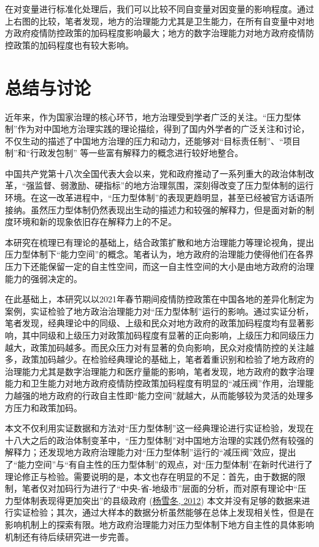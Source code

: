 \documentclass[
  12pt,
]{ctexart}
\begin{document}
在对变量进行标准化处理后，我们可以比较不同自变量对因变量的影响程度。通过上右图的比较，笔者发现，地方的治理能力尤其是卫生能力，在所有自变量中对地方政府疫情防控政策的加码程度影响最大；地方的数字治理能力对地方政府疫情防控政策的加码程度也有较大影响。

\hypertarget{ux603bux7ed3ux4e0eux8ba8ux8bba}{%
\section{总结与讨论}\label{ux603bux7ed3ux4e0eux8ba8ux8bba}}

近年来，作为国家治理的核心环节，地方治理受到学者广泛的关注。``压力型体制''作为对中国地方治理实践的理论描绘，得到了国内外学者的广泛关注和讨论，不仅生动的描述了中国地方治理的压力和动力，还能够对``目标责任制''、``项目制''和``行政发包制'' 等一些富有解释力的概念进行较好地整合。

中国共产党第十八次全国代表大会以来，党和政府推动了一系列重大的政治体制改革，``强监督、弱激励、硬指标''的地方治理氛围，深刻得改变了压力型体制的运行环境。在这一改革进程中，``压力型体制''的表现更趋明显，甚至已经被官方话语所接纳。虽然压力型体制仍然表现出生动的描述力和较强的解释力，但是面对新的制度环境和新的现象依旧存在解释力上的不足。

本研究在梳理已有理论的基础上，结合政策扩散和地方治理能力等理论视角，提出压力型体制下``能力空间''的概念。笔者认为，地方政府的治理能力使得他们在各界压力下还能保留一定的自主性空间，而这一自主性空间的大小是由地方政府的治理能力的强弱决定的。

在此基础上，本研究以以2021年春节期间疫情防控政策在中国各地的差异化制定为案例，实证检验了地方政治治理能力对``压力型体制''运行的影响。通过实证分析，笔者发现，经典理论中的同级、上级和民众对地方政府的政策加码程度均有显著影响，其中同级和上级压力对政策加码程度有显著的正向影响，上级压力和同级压力越大，政策加码越多。而民众压力对有显著的负向影响，民众对疫情防控的关注越多，政策加码越少。在检验经典理论的基础上，笔者着重识别和检验了地方政府的治理能力尤其是数字治理能力和医疗量能的影响，笔者发现，地方政府的数字治理能力和卫生能力对地方政府疫情防控政策加码程度有明显的``减压阀''作用，治理能力越强的地方政府的行政自主性即``能力空间''就越大，从而能够较为灵活的处理多方压力和政策加码。

本文不仅利用实证数据和方法对``压力型体制''这一经典理论进行实证检验，发现在十八大之后的政治体制变革中，``压力型体制''对中国地方治理的实践仍然有较强的解释力；还发现地方政府治理能力对``压力型体制''运行的``减压阀''效应，提出了``能力空间''与``有自主性的压力型体制''的观点，对``压力型体制''在新时代进行了理论修正与检验。需要说明的是，本文也存在明显的不足：首先，由于数据的限制，笔者仅对加码行为进行了``中央-省-地级市''层面的分析，而对原有理论中``压力型体制表现得更加突出''的县级政府 (\protect\hyperlink{ref-YangXueDong2012}{杨雪冬, 2012}) 本文并没有足够的数据来进行实证检验；其次，通过大样本的数据分析虽然能够在总体上发现相关性，但是在影响机制上的探索有限。地方政府治理能力对压力型体制下地方自主性的具体影响机制还有待后续研究进一步完善。
\end{document}
